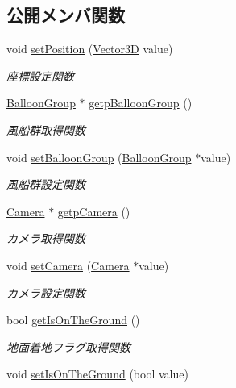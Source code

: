 \subsection*{公開メンバ関数}
\begin{DoxyCompactItemize}
\item 
void \mbox{\hyperlink{class_player_a4d067dc5b3d71b842b09b2149cb26276}{set\+Position}} (\mbox{\hyperlink{class_vector3_d}{Vector3D}} value)
\begin{DoxyCompactList}\small\item\em 座標設定関数 \end{DoxyCompactList}\item 
\mbox{\hyperlink{class_balloon_group}{Balloon\+Group}} $\ast$ \mbox{\hyperlink{class_player_a60a79ad6d48a709e94c97178bb6f669a}{getp\+Balloon\+Group}} ()
\begin{DoxyCompactList}\small\item\em 風船群取得関数 \end{DoxyCompactList}\item 
void \mbox{\hyperlink{class_player_a9e5527047eded7fdeef45eb94d7d488a}{set\+Balloon\+Group}} (\mbox{\hyperlink{class_balloon_group}{Balloon\+Group}} $\ast$value)
\begin{DoxyCompactList}\small\item\em 風船群設定関数 \end{DoxyCompactList}\item 
\mbox{\hyperlink{class_camera}{Camera}} $\ast$ \mbox{\hyperlink{class_player_aba339bf40ee75457b4c436c68b4670cd}{getp\+Camera}} ()
\begin{DoxyCompactList}\small\item\em カメラ取得関数 \end{DoxyCompactList}\item 
void \mbox{\hyperlink{class_player_aa8e97731aaa160060e6f9c9784297140}{set\+Camera}} (\mbox{\hyperlink{class_camera}{Camera}} $\ast$value)
\begin{DoxyCompactList}\small\item\em カメラ設定関数 \end{DoxyCompactList}\item 
bool \mbox{\hyperlink{class_player_aeb7e5d371b48735a6a9088fbe147d531}{get\+Is\+On\+The\+Ground}} ()
\begin{DoxyCompactList}\small\item\em 地面着地フラグ取得関数 \end{DoxyCompactList}\item 
void \mbox{\hyperlink{class_player_ae6433f8257774cb0eb102b7ad0431161}{set\+Is\+On\+The\+Ground}} (bool value)

\end{DoxyCompactItemize}
